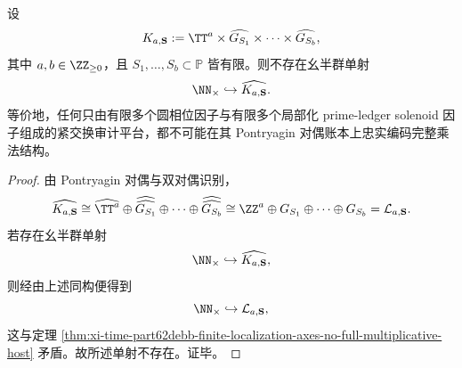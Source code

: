 
\begin{theorem}\label{thm:xi-time-part62debb-finite-circle-solenoid-dual-ledger-obstruction}
设
\[
K_{a,\mathbf S}
:=
\TT^a\times \widehat{G_{S_1}}\times\cdots\times \widehat{G_{S_b}},
\]
其中 \(a,b\in\ZZ_{\ge 0}\)，且 \(S_1,\dots,S_b\subset \mathbb P\) 皆有限。则不存在幺半群单射
\[
\NN_{\times}\hookrightarrow \widehat{K_{a,\mathbf S}}.
\]
等价地，任何只由有限多个圆相位因子与有限多个局部化 prime-ledger solenoid 因子组成的紧交换审计平台，都不可能在其 Pontryagin 对偶账本上忠实编码完整乘法结构。
\end{theorem}
\begin{proof}
由 Pontryagin 对偶与双对偶识别，
\[
\widehat{K_{a,\mathbf S}}
\cong
\widehat{\TT^a}\oplus
\widehat{\widehat{G_{S_1}}}\oplus\cdots\oplus \widehat{\widehat{G_{S_b}}}
\cong
\ZZ^a\oplus G_{S_1}\oplus\cdots\oplus G_{S_b}
=
\mathcal L_{a,\mathbf S}.
\]
若存在幺半群单射
\[
\NN_{\times}\hookrightarrow \widehat{K_{a,\mathbf S}},
\]
则经由上述同构便得到
\[
\NN_{\times}\hookrightarrow \mathcal L_{a,\mathbf S},
\]
这与定理
\ref{thm:xi-time-part62debb-finite-localization-axes-no-full-multiplicative-host}
矛盾。故所述单射不存在。证毕。
\end{proof}

\endinput
